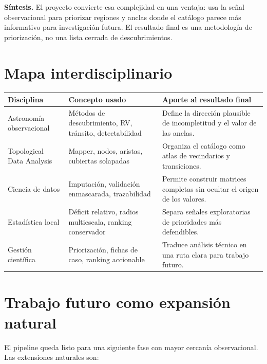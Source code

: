 \documentclass[11pt]{article}
\begin{document}
\textbf{Síntesis.} El proyecto convierte esa complejidad en una ventaja: usa la señal observacional para priorizar regiones y anclas donde el catálogo parece más informativo para investigación futura. El resultado final es una metodología de priorización, no una lista cerrada de descubrimientos.

\section{Mapa interdisciplinario}

\begin{center}
\begin{tabular}{@{}p{}p{}p{}@{}}
\toprule
\textbf{Disciplina} & \textbf{Concepto usado} & \textbf{Aporte al resultado final} \\
\midrule
Astronomía observacional & Métodos de descubrimiento, RV, tránsito, detectabilidad & Define la dirección plausible de incompletitud y el valor de las anclas. \\
Topological Data Analysis & Mapper, nodos, aristas, cubiertas solapadas & Organiza el catálogo como atlas de vecindarios y transiciones. \\
Ciencia de datos & Imputación, validación enmascarada, trazabilidad & Permite construir matrices completas sin ocultar el origen de los valores. \\
Estadística local & Déficit relativo, radios multiescala, ranking conservador & Separa señales exploratorias de prioridades más defendibles. \\
Gestión científica & Priorización, fichas de caso, ranking accionable & Traduce análisis técnico en una ruta clara para trabajo futuro. \\
\bottomrule
\end{tabular}
\end{center}

\section{Trabajo futuro como expansión natural}

El pipeline queda listo para una siguiente fase con mayor cercanía observacional. Las extensiones naturales son:
\end{document}

